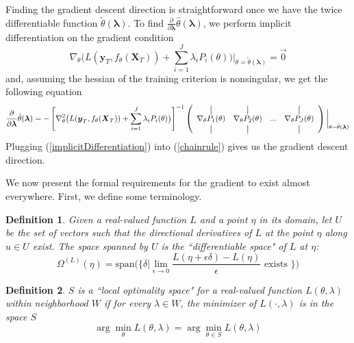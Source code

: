 \documentclass[10pt,letterpaper]{article}
\newtheorem{definition}{Definition}
\newcommand*{\vertbar}{\rule[-1ex]{0.5pt}{2.5ex}}
\begin{document}
Finding the gradient descent direction is straightforward once we have the twice differentiable function $\tilde \theta(\boldsymbol{\lambda})$. To find $\frac{\partial}{\partial \boldsymbol{\lambda}} \hat{\theta}(\boldsymbol{\lambda})$, we perform implicit differentiation on the gradient condition
\begin{equation}
\nabla_\theta \Big ( L(\boldsymbol{y}_T, f_\theta (\boldsymbol{X}_T)) + \sum\limits_{i=1}^J \lambda_i P_i(\theta) \Big ) \Big |_{\theta = \tilde \theta(\boldsymbol{\lambda})} = \vec{0}
\end{equation}
and, assuming the hessian of the training criterion is nonsingular, we get the following equation
\begin{equation}
\frac{\partial}{\partial \boldsymbol{\lambda}} \tilde{\theta}(\boldsymbol{\lambda}) = 
- \left [ \nabla_\theta^2 \big (  L(\boldsymbol{y}_T, f_\theta (\boldsymbol{X}_T))  +  \sum\limits_{i=1}^J \lambda_i P_i(\theta)  \big )  \right ]^{-1}
\left (
\begin{array}{cccc}
\vertbar & \vertbar &        & \vertbar \\
\nabla_\theta P_1(\theta) & \nabla_\theta P_2(\theta) &  ... &  \nabla_\theta P_J(\theta) \\
\vertbar & \vertbar &        & \vertbar 
\end{array}
\right ) \bigg |_{\theta = \tilde \theta(\boldsymbol{\lambda})}
\label{implicitDifferentiation}
\end{equation}
Plugging (\ref{implicitDifferentiation}) into (\ref{chainrule}) gives us the gradient descent direction.

We now present the formal requirements for the gradient to exist almost everywhere. First, we define some terminology.

\begin{definition}
Given a real-valued function $L$ and a point $\eta$ in its domain, let $U$ be the set of vectors such that the directional derivatives of $L$ at the point $\eta$ along $u \in U$ exist. The space spanned by $U$ is the ``differentiable space" of $L$ at $\eta$:
\begin{equation}
\Omega^{(L)}(\eta) = \text{span} \Big(\Big\{ \delta | \lim_{\epsilon \rightarrow 0} \frac{L(\eta + \epsilon \delta) - L(\eta)}{\epsilon} \text{ exists } \Big\}\Big)
\end{equation}
\end{definition}

\begin{definition}
$S$ is a ``local optimality space" for a real-valued function $L(\theta, \lambda)$ within neighborhood $W$ if for every $\lambda \in W$, the minimizer of $L(\cdot, \lambda)$ is in the space $S$
\begin{equation}
\arg \min_\theta L(\theta, \lambda) = \arg \min_{\theta \in S} L(\theta, \lambda)
\end{equation}
\end{definition}
\end{document}
